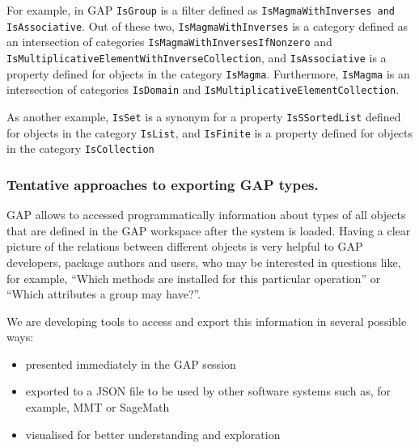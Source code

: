 For example, in GAP \texttt{IsGroup} is a filter defined as 
\texttt{IsMagmaWithInverses and IsAssociative}. Out of these
two, \texttt{IsMagmaWithInverses} is a category defined as an intersection
of categories \texttt{IsMagmaWithInversesIfNonzero} and
\texttt{IsMultiplicativeElementWithInverseCollection}, 
and \texttt{IsAssociative} is a property defined for objects
in the category \texttt{IsMagma}. Furthermore, \texttt{IsMagma} is
an intersection of categories \texttt{IsDomain} and 
\texttt{IsMultiplicativeElementCollection}.

As another example, \texttt{IsSet} is a synonym for a property \texttt{IsSSortedList} 
defined for objects in the category \texttt{IsList}, and \texttt{IsFinite} 
is a property defined for objects in the category \texttt{IsCollection} 




\subsubsection{Tentative approaches to exporting GAP types.}\label{gap-types-export}

GAP allows to accessed programmatically information about types of all 
objects that are defined in the GAP workspace after the system is loaded.
Having a clear picture of the relations between different objects is 
very helpful to GAP developers, package authors and users, who may be 
interested in questions like, for example, 
``Which methods are installed for this particular operation'' or 
``Which attributes a group may have?''. 

We are developing tools to access and export this information in several possible ways:
\begin{itemize}
\item presented immediately in the GAP session
\item exported to a JSON file to be used by other software systems 
such as, for example, MMT or SageMath
\item visualised for better understanding and exploration
\end{itemize}


